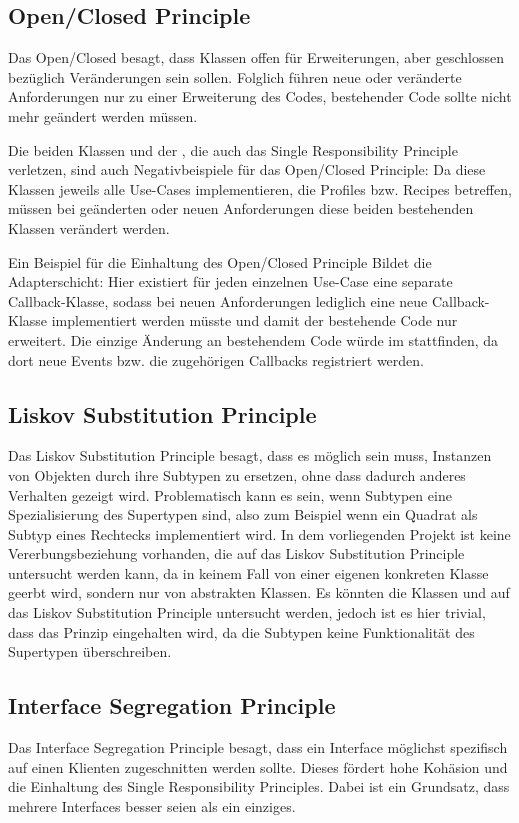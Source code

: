 \subsection{Open/Closed Principle}
Das Open/Closed besagt, dass Klassen offen für Erweiterungen, aber geschlossen bezüglich Veränderungen sein sollen. Folglich führen neue oder veränderte Anforderungen nur zu einer Erweiterung des Codes, bestehender Code sollte nicht mehr geändert werden müssen.

Die beiden Klassen  und der , die auch das Single Responsibility Principle verletzen, sind auch Negativbeispiele für das Open/Closed Principle: Da diese Klassen jeweils alle Use-Cases implementieren, die Profiles bzw. Recipes betreffen, müssen bei geänderten oder neuen Anforderungen diese beiden bestehenden Klassen verändert werden.

Ein Beispiel für die Einhaltung des Open/Closed Principle Bildet die Adapterschicht: Hier existiert für jeden einzelnen Use-Case eine separate Callback-Klasse, sodass bei neuen Anforderungen lediglich eine neue Callback-Klasse implementiert werden müsste und damit der bestehende Code nur erweitert. Die einzige Änderung an bestehendem Code würde im  stattfinden, da dort neue Events bzw. die zugehörigen Callbacks registriert werden.

\subsection{Liskov Substitution Principle}
Das Liskov Substitution Principle besagt, dass es möglich sein muss, Instanzen von Objekten durch ihre Subtypen zu ersetzen, ohne dass dadurch anderes Verhalten gezeigt wird. Problematisch kann es sein, wenn Subtypen eine Spezialisierung des Supertypen sind, also zum Beispiel wenn ein Quadrat als Subtyp eines Rechtecks implementiert wird. In dem vorliegenden Projekt ist keine Vererbungsbeziehung vorhanden, die auf das Liskov Substitution Principle untersucht werden kann, da in keinem Fall von einer eigenen konkreten Klasse geerbt wird, sondern nur von abstrakten Klassen. Es könnten die Klassen  und  auf das Liskov Substitution Principle untersucht werden, jedoch ist es hier trivial, dass das Prinzip eingehalten wird, da die Subtypen keine Funktionalität des Supertypen überschreiben.

\subsection{Interface Segregation Principle}
Das Interface Segregation Principle besagt, dass ein Interface möglichst spezifisch auf einen Klienten zugeschnitten werden sollte. Dieses fördert hohe Kohäsion und die Einhaltung des Single Responsibility Principles. Dabei ist ein Grundsatz, dass mehrere Interfaces besser seien als ein einziges.

